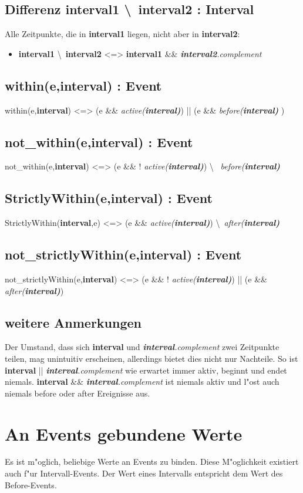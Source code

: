 \documentclass[article,colorback,accentcolor=tud4c]{tudreport}
\newcommand{\before}[1]{\textit{ before(#1) }}
\newcommand{\after}[1]{\textit{after(#1)}}
\newcommand{\aktiv}[1]{\textit{active(#1)}}
\newcommand{\Interval}[1]{\textbf{interval#1}}
\newcommand{\comp}[1]{\textit{#1.complement}}
\begin{document}
\subsection{Differenz \Interval{1} \textbackslash\ \Interval{2} : Interval}
Alle Zeitpunkte, die in \Interval{1} liegen, nicht aber in \Interval{2}:
\begin{itemize}
  \item  \Interval{1} \textbackslash\ \Interval{2} <=> \Interval{1} \&\&
  \comp{\Interval{2}}
\end{itemize}


\subsection{within(e,\Interval{}) : Event}
within(e,\Interval{}) <=> (e \&\& \aktiv{\Interval}) || (e \&\& \before{\Interval})

\subsection{not\_within(e,\Interval{}) : Event}
not\_within(e,\Interval{}) <=> (e \&\& ! \aktiv{\Interval}) \textbackslash\ \before{\Interval}

\subsection{ StrictlyWithin(e,\Interval{}) : Event}
StrictlyWithin(\Interval{},e) <=> (e \&\& \aktiv{\Interval}) \textbackslash\ \after{\Interval}

\subsection{ not\_strictlyWithin(e,\Interval{}) : Event }
not\_strictlyWithin(e,\Interval{}) <=> (e \&\& ! \aktiv{\Interval}) || (e \&\& \after{\Interval})


\subsection{weitere Anmerkungen}
Der Umstand, dass sich \Interval{} und \comp{\Interval{}} zwei Zeitpunkte teilen, mag
unintuitiv erscheinen, allerdings  bietet dies nicht nur Nachteile. So ist \Interval{}
|| \comp{\Interval{}} wie  erwartet immer aktiv, beginnt und endet niemals. \Interval{}
\&\& \comp{\Interval{}} ist niemals aktiv  und l"ost auch niemals before oder
after Ereignisse aus.

  \section{An Events gebundene Werte}
Es ist m"oglich, beliebige Werte an Events zu binden. Diese M"oglichkeit
existiert auch f"ur Intervall-Events. Der Wert eines Intervalls entspricht dem Wert des Before-Events.
\end{document}
